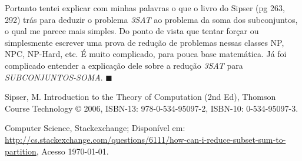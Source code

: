 \documentclass[12pt, a4paper]{article}
\begin{document}
Portanto tentei explicar com minhas palavras o que o livro do Sipser (pg 263, 292) trás para deduzir o problema \textit{3SAT} ao problema da soma dos subconjuntos, o qual me parece mais simples. Do ponto de vista que tentar forçar ou simplesmente escrever uma prova de redução de problemas nessas classes NP, NPC, NP-Hard, etc. É muito complicado, para pouca base matemática. Já foi complicado entender a explicação dele sobre a redução \textit{3SAT} para \textit{SUBCONJUNTOS-SOMA}. $\blacksquare$

\pagebreak
\begin{thebibliography}{9}

 Sipser, M. Introduction to the Theory of Computation (2nd Ed), Thomson Course Technology © 2006, ISBN-13: 978-0-534-95097-2, ISBN-10: 0-534-95097-3.

 Computer Science, Stackexchange; Disponível em: \href{http://cs.stackexchange.com/questions/6111/how-can-i-reduce-subset-sum-to-partition}{http://cs.stackexchange.com/questions/6111/how-can-i-reduce-subset-sum-to-partition}, Acesso \today.


\end{thebibliography}
\end{document}
